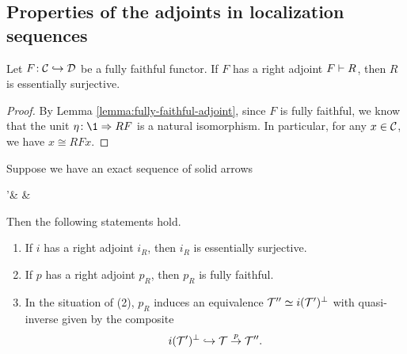 \subsection{Properties of the adjoints in localization sequences}
\begin{lemma}
	Let \(F\!:\mathcal{C}\hookrightarrow\mathcal{D}\) be a fully faithful functor. If \(F\) has a right adjoint \(F\vdash R\), then \(R\) is essentially surjective.
\end{lemma}
\begin{proof}
By Lemma \ref{lemma:fully-faithful-adjoint}, since \(F\) is fully faithful, we know that the unit \(\eta\!:\1\To RF\) is a natural isomorphism. In particular, for any \(x\in\mathcal{C}\), we have \(x \cong RFx\).
\end{proof}
\begin{theorem}\label{thm:localization-sequence-adjoints-properties}
	Suppose we have an exact sequence of solid arrows
	\begin{diagram*}
		\calT'\ar[r,"i",""{above,name=A}] & \calT \ar[r,"p",""{above,name=C}]\ar[l,bend left,shift left,dashed,"i_R",""{below,name=B}] &  \ar[l,bend left,shift left,dashed,"p_R",""{below,name=D}] \ar[from=B,to=A,symbol=\vdash]\ar[from=D,to=C,symbol=\vdash]
	\end{diagram*}
	Then the following statements hold.
	\begin{enumerate}[label=(\arabic*)]
	\item If \(i\) has a right adjoint \(i_R\), then \(i_R\) is essentially surjective.
	\item If \(p\) has a right adjoint \(p_R\), then \(p_R\) is fully faithful.
	\item In the situation of (2), \(p_R\) induces an equivalence \(\mathcal{T}''\simeq i(\mathcal{T}')^\perp\) with quasi-inverse given by the composite
	\[ i(\mathcal{T}')^\perp \hookrightarrow \mathcal{T} \overset{p}\to \mathcal{T}''.  \]
	\end{enumerate}
\end{theorem}

